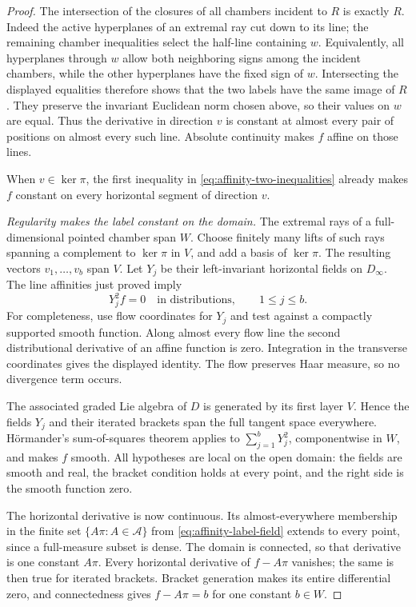 \begin{proof}
The intersection of the closures of all chambers incident to $R$
is exactly $R$.  Indeed the active hyperplanes of an extremal ray
cut down to its line; the remaining chamber inequalities select
the half-line containing $w$.  Equivalently, all hyperplanes
through $w$ allow both neighboring signs among the incident
chambers, while the other hyperplanes have the fixed sign of $w$.
Intersecting the displayed equalities therefore shows that the
two labels have the same image of $R$.  They preserve the invariant
Euclidean norm chosen above, so their values on $w$ are equal.
Thus the derivative in direction $v$ is constant at almost every
pair of positions on almost every such line.  Absolute continuity
makes $f$ affine on those lines.

When $v\in\ker\pi$, the first inequality in
\eqref{eq:affinity-two-inequalities} already makes $f$ constant
on every horizontal segment of direction $v$.

\emph{Regularity makes the label constant on the domain.}
The extremal rays of a full-dimensional pointed chamber span $W$.
Choose finitely many lifts of such rays spanning a complement to
$\ker\pi$ in $V$, and add a basis of $\ker\pi$.  The resulting
vectors $v_1,\ldots,v_b$ span $V$.  Let $Y_j$ be their
left-invariant horizontal fields on $D_\infty$.  The line
affinities just proved imply
\[
 Y_j^2 f=0\quad\text{in distributions},\qquad 1\le j\le b.
\]
For completeness, use flow coordinates for $Y_j$ and test against
a compactly supported smooth function.  Along almost every flow
line the second distributional derivative of an affine function
is zero.  Integration in the transverse coordinates gives the
displayed identity.  The flow preserves Haar measure, so no
divergence term occurs.

The associated graded Lie algebra of $D$ is generated by its first
layer $V$.  Hence the fields $Y_j$ and their iterated brackets span
the full tangent space everywhere.  H\"ormander's sum-of-squares
theorem \cite[Theorem~1.1]{Hormander1967} applies to
$\sum_{j=1}^bY_j^2$, componentwise in $W$, and makes $f$ smooth.
All hypotheses are local on the open domain: the fields are smooth
and real, the bracket condition holds at every point, and the
right side is the smooth function zero.

The horizontal derivative is now continuous.  Its almost-everywhere
membership in the finite set $\{A\pi:A\in\mathcal A\}$ from
\eqref{eq:affinity-label-field} extends to every point, since a
full-measure subset is dense.  The domain is connected, so that
derivative is one constant $A\pi$.  Every horizontal derivative
of $f-A\pi$ vanishes; the same is then true for iterated brackets.
Bracket generation makes its entire differential zero, and
connectedness gives $f-A\pi=b$ for one constant $b\in W$.
\end{proof}

